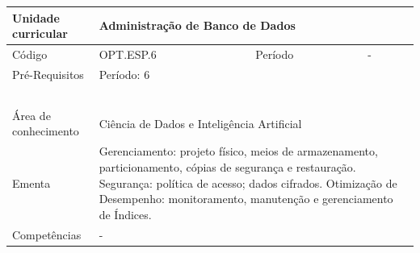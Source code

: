 \clearpage
\newpage

\begin{quadro}[ht!]
  \centering\scriptsize
\caption{Unidade Curricular Administração de Banco de Dados}

\begin{tabular}{|p{2.5cm}|p{2.5cm}|p{2.5cm}|p{2.5cm}|p{2.5cm}|}\hline

  Unidade curricular & \multicolumn{4}{p{10cm}|}{ Administração de Banco de Dados }\\\hline
  Código & OPT.ESP.6 & Período & \multicolumn{2}{p{5cm}|}{ - }\\\hline
  Pré-Requisitos & \multicolumn{4}{p{10cm}|}{ Período: 6 } \\\hline
  \cellcolor{blue1}{ CH PRESENCIAL } &
    \cellcolor{blue1}{CH EAD Síncrona} &
    \cellcolor{blue1}{CH EAD Síncrona Mediada} &
    \cellcolor{blue1}{CH EAD Assíncrona} &
    \cellcolor{blue1}{CH APCC} \\\hline
  \cellcolor{blue1}{ 60 } &
    \cellcolor{blue1}{ 0 } &
    \cellcolor{blue1}{ 30 } &
    \cellcolor{blue1}{ 30 } &
    \cellcolor{blue1}{0} \\\hline
  \cellcolor{blue1}{ CH Teórica } &
    \cellcolor{blue1}{CH Prática} &
    \cellcolor{blue1}{CH Humanidades} &
    \cellcolor{blue1}{CH Extensão} &
    \cellcolor{blue1}{CH EAD TOTAL} \\\hline
  \cellcolor{blue1}{ 30 } &
    \cellcolor{blue1}{ 30 } &
    \cellcolor{blue1}{ 0 } &
    \cellcolor{blue1}{ 0 } &
    \cellcolor{blue1}{ 60 } \\\hline
  \cellcolor{blue1}{CARGA-HORÁRIA TOTAL} & \multicolumn{4}{p{10cm}|}{ \cellcolor{blue1}{ 60 } } \\\hline
  Área de conhecimento & \multicolumn{4}{p{10cm}|}{ Ciência de Dados e Inteligência Artificial } \\\hline
  Ementa & \multicolumn{4}{p{10cm}|}{ Gerenciamento: projeto físico, meios de armazenamento, particionamento, cópias de segurança e restauração. Segurança: política de acesso; dados cifrados. Otimização de Desempenho: monitoramento, manutenção e gerenciamento de Índices. } \\\hline
  Competências & \multicolumn{4}{p{10cm}|}{ - } \\\hline


  
	\end{tabular}

\end{quadro}



